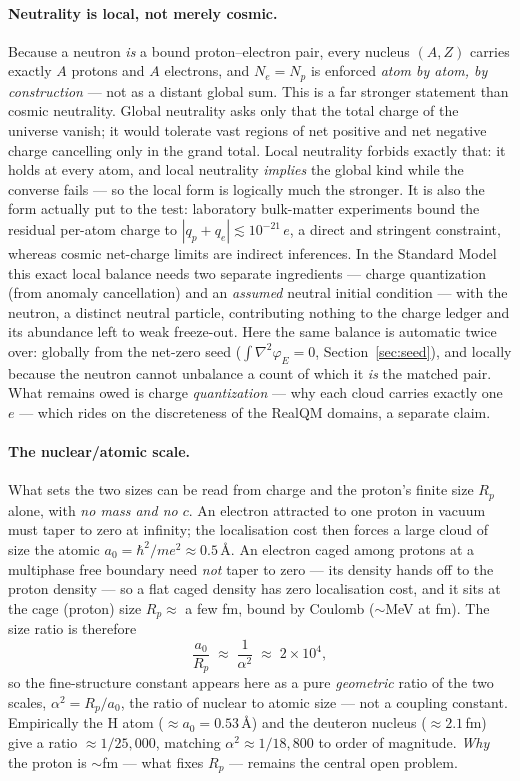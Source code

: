 \documentclass[11pt]{article}
\newcommand{\grad}{\nabla}
\begin{document}
\paragraph{Neutrality is local, not merely cosmic.} Because a neutron \emph{is} a bound proton--electron pair,
every nucleus $(A,Z)$ carries exactly $A$ protons and $A$ electrons, and $N_e=N_p$ is enforced \emph{atom by atom,
by construction} --- not as a distant global sum. This is a far stronger statement than cosmic neutrality. Global
neutrality asks only that the total charge of the universe vanish; it would tolerate vast regions of net positive
and net negative charge cancelling only in the grand total. Local neutrality forbids exactly that: it holds at
every atom, and local neutrality \emph{implies} the global kind while the converse fails --- so the local form is
logically much the stronger. It is also the form actually put to the test: laboratory bulk-matter experiments
bound the residual per-atom charge to $|q_p+q_e|\lesssim10^{-21}\,e$, a direct and stringent constraint, whereas
cosmic net-charge limits are indirect inferences. In the Standard Model this exact local balance needs two
separate ingredients --- charge quantization (from anomaly cancellation) and an \emph{assumed} neutral initial
condition --- with the neutron, a distinct neutral particle, contributing nothing to the charge ledger and its
abundance left to weak freeze-out. Here the same balance is automatic twice over: globally from the net-zero seed
($\int\grad^2\varphi_E=0$, Section~\ref{sec:seed}), and locally because the neutron cannot unbalance a count of
which it \emph{is} the matched pair. What remains owed is charge \emph{quantization} --- why each cloud carries
exactly one $e$ --- which rides on the discreteness of the RealQM domains, a separate claim.

\paragraph{The nuclear/atomic scale.} What sets the two sizes can be read from charge and the proton's finite size
$R_p$ alone, with \emph{no mass and no $c$}. An electron attracted to one proton in vacuum must taper to zero at
infinity; the localisation cost then forces a large cloud of size the atomic $a_0=\hbar^2/me^2\approx0.5$\,\AA. An
electron caged among protons at a multiphase free boundary need \emph{not} taper to zero --- its density hands off
to the proton density --- so a flat caged density has zero localisation cost, and it sits at the cage (proton) size
$R_p\approx$ a few fm, bound by Coulomb (${\sim}$MeV at fm). The size ratio is therefore
\begin{equation}
\frac{a_0}{R_p}\;\approx\;\frac{1}{\alpha^2}\;\approx\;2\times10^{4},
\end{equation}
so the fine-structure constant appears here as a pure \emph{geometric} ratio of the two scales,
$\alpha^2=R_p/a_0$, the ratio of nuclear to atomic size --- not a coupling constant. Empirically the H atom
($\approx a_0=0.53$\,\AA) and the deuteron nucleus ($\approx 2.1$\,fm) give a ratio $\approx1/25{,}000$, matching
$\alpha^2\approx1/18{,}800$ to order of magnitude. \emph{Why} the proton is ${\sim}$fm --- what fixes $R_p$ ---
remains the central open problem.
\end{document}
